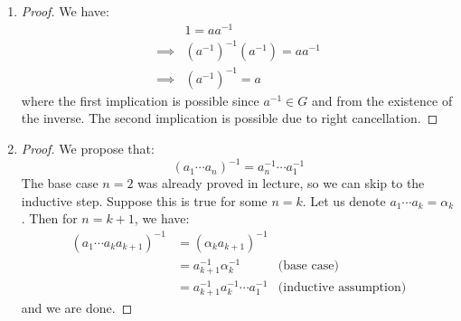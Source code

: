 \begin{sol}
    \begin{enumerate}
        \item \begin{proof}
            We have:
            \begin{align}
                & 1 =aa^{-1} \\
                \implies & (a^{-1})^{-1}(a^{-1}) = aa^{-1} \\ 
                \implies & (a^{-1})^{-1} = a
            \end{align}
            where the first implication is possible since $a^{-1} \in G$ and from the existence of the inverse. The second implication is possible due to right cancellation.
        \end{proof}
        \item \begin{proof}
            We propose that:
            \begin{equation}
                (a_1\cdots a_n)^{-1} = a_n^{-1}\cdots a_1^{-1}
            \end{equation}
            The base case $n=2$ was already proved in lecture, so we can skip to the inductive step. Suppose this is true for some $n=k$. Let us denote $a_1\cdots a_k = \alpha_k$. Then for $n=k+1$, we have:
            \begin{align}
                (a_1\cdots a_{k} a_{k+1})^{-1} &= (\alpha_k a_{k+1})^{-1} \\ 
                &= a_{k+1}^{-1} \alpha_k^{-1} & \text{(base case)} \\ 
                &= a_{k+1}^{-1}a_{k}^{-1}\cdots a_1^{-1} & \text{(inductive assumption)}
            \end{align}
            and we are done.
        \end{proof}
    \end{enumerate}
\end{sol}